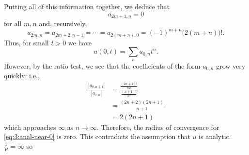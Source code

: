 \begin{solution*}
  Putting all of this information together, we deduce that
  \[
    a_{2m+1,n}=0
  \]
  for all \(m,n\) and, recursively,
  \[
    a_{2m,n}=a_{2m+2,n-1}=\dotsb=
    a_{2(m+n),0}=(-1)^{m+n}\bigl(2(m+n)\bigr)!.
  \]
  Thus, for small \(t>0\) we have
  \begin{equation}
    \label{eq:3:anal-near-0}
    u(0,t)=\sum_{n}a_{0,n}t^n.
  \end{equation}
  However, by the ratio test, we see that the coefficients of the form
  \(a_{0,n}\) grow very quickly; i.e.,
  \begin{align*}
    \frac{|a_{0,n+1}|}{|a_{0,n}|}
    &=\frac{\frac{(2n+2)!}{2n!}}{\frac{(n+1)!}{n!}}\\
    &=\frac{(2n+2)(2n+1)}{n+1}\\
    &=2(2n+1)
  \end{align*}
  which approaches \(\infty\) as \(n\to\infty\). Therefore, the radius of
  convergence for \eqref{eq:3:anal-near-0} is zero. This contradicts the
  assumption that \(u\) is analytic.
  \(\frac{1}{R}=\infty\) so
\end{solution*}

